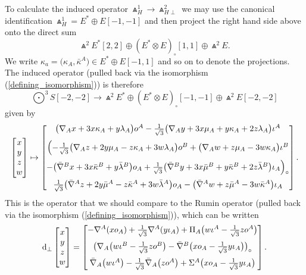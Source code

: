 \documentclass[pdftex]{sigma}%
\numberwithin{equation}{section}
\begin{document}
To calculate the induced operator $\Wedge_H^1 \to \Wedge_{H\perp}^2$ we may use
the canonical identification \mbox{$\Wedge_H^1 = E^* \oplus E[-1,-1]$} and then
project the right hand side above onto the direct sum
\[\Wedge^2E^*[2,2] \oplus (E^* \otimes E)_\circ[1,1] \oplus \Wedge^2E.\]
We write $\kappa_a = \big(\kappa_A, \bar{\kappa}^A\big) \in E^* \oplus E[-1,1]$ and so
on to denote the projections. The induced operator (pulled back via the
isomorphism (\ref{defining_isomorphism})) is therefore
\[\textstyle\bigodot^3\!S[-2,-2] \to \Wedge^2E^*
\oplus (E^* \otimes E)_\circ[-1,-1] \oplus \Wedge^2E[-2,-2]\]
given by
\begin{gather*}
 \begin{bmatrix}
 x \\
 y \\
 z \\
 w
 \end{bmatrix} \mapsto  \begin{bmatrix}
\big(\nabla_{A}x+ 3x\kappa_{A}+ y\lambda_{A}\big)o^{A}
- \frac{1}{\sqrt{3}}\big(\nabla_{A}y + 3x\mu_{A}+ y\kappa_{A}
+ 2z\lambda_{A}\big)\iota^{A} \vspace{2mm}\\
\Big( {-}\frac{1}{\sqrt{3}}\big(\nabla_{A}z + 2y\mu_{A} - z\kappa_{A}
+ 3w\lambda_{A}\big)o^B + \big(\nabla_{A}w + z\mu_{A}
- 3w\kappa_{A}\big)\iota^B \vspace{2mm}\\
- \big(\bar{\nabla}^Bx + 3x\bar{\kappa}^B + y\bar{\lambda}^B\big)o_A
+ \frac{1}{\sqrt{3}}\big(\bar{\nabla}^By + 3x\bar{\mu}^B + y\bar{\kappa}^B
+ 2z\bar{\lambda}^B\big)\iota_A \Big)\rule[-5pt]{0pt}{5pt}_{\circ}\vspace{2mm}\\
\frac{1}{\sqrt{3}}\big(\bar{\nabla}^{A}z + 2y\bar{\mu}^{A} - z\bar{ \kappa}^{A}
+ 3w\bar{\lambda}^{A}\big)o_{A} - \big(\bar{\nabla}^{A}w + z\bar{\mu}^{A}
- 3w\bar{\kappa}^{A}\big)\iota_{A}
\end{bmatrix}.
\end{gather*}
This is the operator that we should compare to the Rumin operator (pulled back
via the isomorphism (\ref{defining_isomorphism})), which can be written
\[{\rm d}_\perp \begin{bmatrix} x \\ y \\z \\w \end{bmatrix} =
\begin{bmatrix}
-\nabla^A(xo_A) + \frac{1}{\sqrt{3}}\nabla^A(y\iota_A)
+\Pi_A\big(w\iota^A-\frac{1}{\sqrt{3}}zo^A\big) \vspace{2mm}\\
\big(\nabla_A\big(w\iota^B-\frac{1}{\sqrt{3}}zo^B\big)
- \bar{\nabla}^B\big(xo_A-\frac{1}{\sqrt{3}}y\iota_A\big)\big)_\circ \vspace{2mm}\\
\bar{\nabla}_A\big(w\iota^A\big) - \frac{1}{\sqrt{3}}\bar{\nabla}_A\big(zo^A\big)
+ \Sigma^A\big(xo_A-\frac{1}{\sqrt{3}}y\iota_A\big)
\end{bmatrix}.\]
\end{document}
